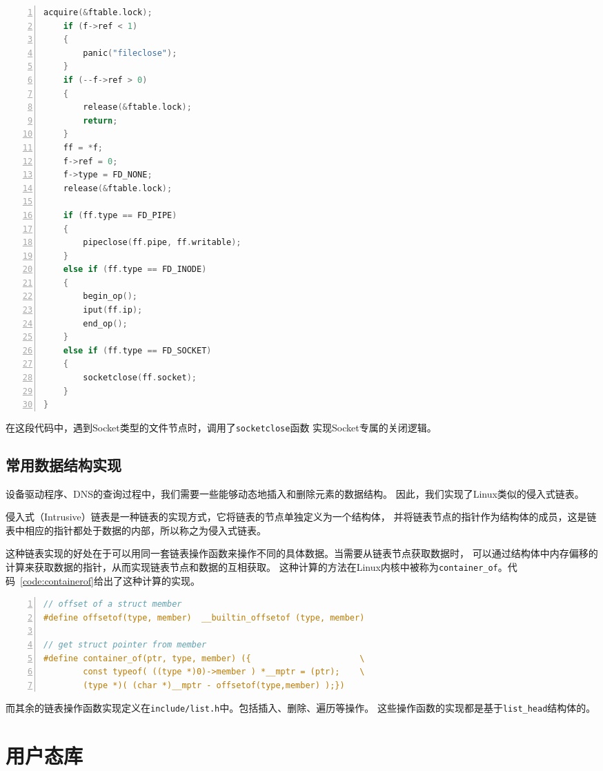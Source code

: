 \documentclass[a4paper,twoside]{ctexrep}
\begin{document}
\begin{spacing}{1.2}
\begin{lstlisting}[numbers=left,style=CppStyle,caption={file\_alloc函数的修改},label={code:fileclose},language=C]
	acquire(&ftable.lock);
	if (f->ref < 1)
	{
		panic("fileclose");
	}
	if (--f->ref > 0)
	{
		release(&ftable.lock);
		return;
	}
	ff = *f;
	f->ref = 0;
	f->type = FD_NONE;
	release(&ftable.lock);

	if (ff.type == FD_PIPE)
	{
		pipeclose(ff.pipe, ff.writable);
	}
	else if (ff.type == FD_INODE)
	{
		begin_op();
		iput(ff.ip);
		end_op();
	}
	else if (ff.type == FD_SOCKET)
	{
		socketclose(ff.socket);
	}
}
\end{lstlisting}

在这段代码中，遇到Socket类型的文件节点时，调用了\texttt{socketclose}函数
实现Socket专属的关闭逻辑。

\subsection{常用数据结构实现}

设备驱动程序、DNS的查询过程中，我们需要一些能够动态地插入和删除元素的数据结构。
因此，我们实现了Linux类似的侵入式链表。

侵入式（Intrusive）链表是一种链表的实现方式，它将链表的节点单独定义为一个结构体，
并将链表节点的指针作为结构体的成员，这是链表中相应的指针都处于数据的内部，所以称之为侵入式链表。

这种链表实现的好处在于可以用同一套链表操作函数来操作不同的具体数据。当需要从链表节点获取数据时，
可以通过结构体中内存偏移的计算来获取数据的指针，从而实现链表节点和数据的互相获取。
这种计算的方法在Linux内核中被称为\texttt{container\_of}。代码~\ref{code:containerof}给出了这种计算的实现。

\begin{lstlisting}[numbers=left,style=CppStyle,caption={container\_of宏的实现},label={code:containerof},language=C]
// offset of a struct member
#define offsetof(type, member)  __builtin_offsetof (type, member)

// get struct pointer from member
#define container_of(ptr, type, member) ({                      \
        const typeof( ((type *)0)->member ) *__mptr = (ptr);    \
        (type *)( (char *)__mptr - offsetof(type,member) );})
\end{lstlisting}

而其余的链表操作函数实现定义在\texttt{include/list.h}中。包括插入、删除、遍历等操作。
这些操作函数的实现都是基于\texttt{list\_head}结构体的。

\section{用户态库}


\end{spacing}
\end{document}
